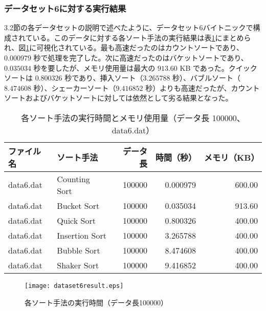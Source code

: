 \documentclass[a4j, 11pt]{jarticle}
\begin{document}
\subsubsection{データセット6に対する実行結果}
3.2節の各データセットの説明で述べたように、データセット6バイトニックで構成されている。このデータに対する各ソート手法の実行結果は表\ref{dataset6allresult}にまとめられ、図\ref{dataset6allresultgraph}に可視化されている。最も高速だったのはカウントソートであり、$0.000979$ 秒で処理を完了した。次に高速だったのはバケットソートであり、$0.035034$ 秒を要したが、メモリ使用量は最大の $913.60$ KB であった。クイックソートは $0.800326$ 秒であり、挿入ソート（$3.265788$ 秒）、バブルソート（$8.474608$ 秒）、シェーカーソート（$9.416852$ 秒）よりも高速だったが、カウントソートおよびバケットソートに対しては依然として劣る結果となった。
\begin{table}[H]
  \centering
  \caption{各ソート手法の実行時間とメモリ使用量（データ長 100000、data6.dat）}\label{dataset6allresult}
  \begin{tabular}{|l|l|r|r|r|}
    \hline
    \textbf{ファイル名} & \textbf{ソート手法} & \textbf{データ長} & \textbf{時間（秒）} & \textbf{メモリ（KB）} \\
    \hline
    data6.dat & Counting Sort  & 100000 & 0.000979  & 600.00 \\
    data6.dat & Bucket Sort    & 100000 & 0.035034  & 913.60 \\
    data6.dat & Quick Sort     & 100000 & 0.800326  & 400.00 \\
    data6.dat & Insertion Sort & 100000 & 3.265788  & 400.00 \\
    data6.dat & Bubble Sort    & 100000 & 8.474608  & 400.00 \\
    data6.dat & Shaker Sort    & 100000 & 9.416852  & 400.00 \\
    \hline
  \end{tabular}
\end{table}
\begin{figure}[H]
  \centering
  \texttt{[image: dataset6result.eps]}
  \caption{各ソート手法の実行時間（データ長100000）}\label{dataset6allresultgraph}
\end{figure}
\end{document}
